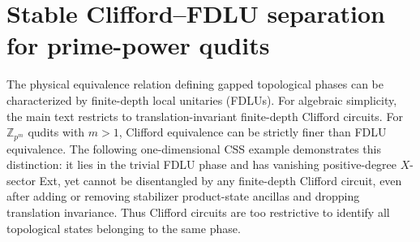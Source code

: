 \documentclass[aps,prx,english,superscriptaddress,twocolumn,tightenlines,showpacs,longbibliography,floatfix,amsfonts]{revtex4-2}
\theoremstyle{remark}
\theoremstyle{definition}
\begin{document}
\section{Stable Clifford--FDLU separation for prime-power qudits}
\label{app:pm-obstruction}

The physical equivalence relation defining gapped topological phases can be characterized
by finite-depth local unitaries (FDLUs). For algebraic simplicity, the main
text restricts to translation-invariant finite-depth Clifford circuits. For
\(\mathbb Z_{p^m}\) qudits with \(m>1\), Clifford equivalence can be strictly
finer than FDLU equivalence. The following one-dimensional CSS example
demonstrates this distinction: it lies in the trivial FDLU phase
and has vanishing positive-degree \(X\)-sector Ext, yet cannot be disentangled
by any finite-depth Clifford circuit, even after adding or removing stabilizer
product-state ancillas and dropping translation invariance. Thus Clifford circuits are too restrictive to identify all topological states belonging to the same phase.
\end{document}
